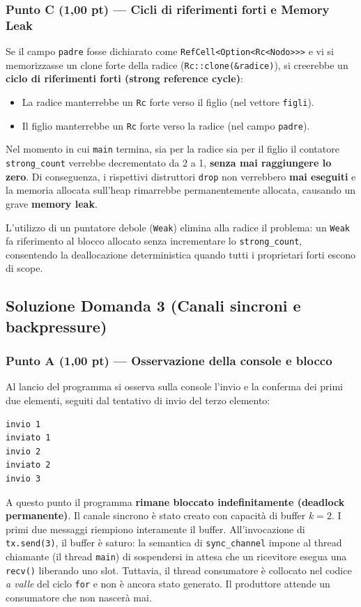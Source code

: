 \documentclass[11pt,a4paper]{article}
\begin{document}
\subsubsection*{Punto C (1,00 pt) --- Cicli di riferimenti forti e Memory Leak}
Se il campo \texttt{padre} fosse dichiarato come \texttt{RefCell<Option<Rc<Nodo>>>} e vi si memorizzasse un clone forte della radice (\texttt{Rc::clone(\&radice)}), si creerebbe un \textbf{ciclo di riferimenti forti (strong reference cycle)}:
\begin{itemize}[leftmargin=1.5em]
    \item La radice manterrebbe un \texttt{Rc} forte verso il figlio (nel vettore \texttt{figli}).
    \item Il figlio manterrebbe un \texttt{Rc} forte verso la radice (nel campo \texttt{padre}).
\end{itemize}
Nel momento in cui \texttt{main} termina, sia per la radice sia per il figlio il contatore \texttt{strong\_count} verrebbe decrementato da 2 a 1, \textbf{senza mai raggiungere lo zero}. Di conseguenza, i rispettivi distruttori \texttt{drop} non verrebbero \textbf{mai eseguiti} e la memoria allocata sull'heap rimarrebbe permanentemente allocata, causando un grave \textbf{memory leak}.

L'utilizzo di un puntatore debole (\texttt{Weak}) elimina alla radice il problema: un \texttt{Weak} fa riferimento al blocco allocato senza incrementare lo \texttt{strong\_count}, consentendo la deallocazione deterministica quando tutti i proprietari forti escono di scope.

\newpage
\subsection{Soluzione Domanda 3 (Canali sincroni e backpressure)}

\subsubsection*{Punto A (1,00 pt) --- Osservazione della console e blocco}
Al lancio del programma si osserva sulla console l'invio e la conferma dei primi due elementi, seguiti dal tentativo di invio del terzo elemento:
\begin{lstlisting}[style=terminal]
invio 1
inviato 1
invio 2
inviato 2
invio 3
\end{lstlisting}
A questo punto il programma \textbf{rimane bloccato indefinitamente (deadlock permanente)}.
Il canale sincrono è stato creato con capacità di buffer $k = 2$. I primi due messaggi riempiono interamente il buffer. All'invocazione di \texttt{tx.send(3)}, il buffer è saturo: la semantica di \texttt{sync\_channel} impone al thread chiamante (il thread \texttt{main}) di sospendersi in attesa che un ricevitore esegua una \texttt{recv()} liberando uno slot. Tuttavia, il thread consumatore è collocato nel codice \emph{a valle} del ciclo \texttt{for} e non è ancora stato generato. Il produttore attende un consumatore che non nascerà mai.
\end{document}

